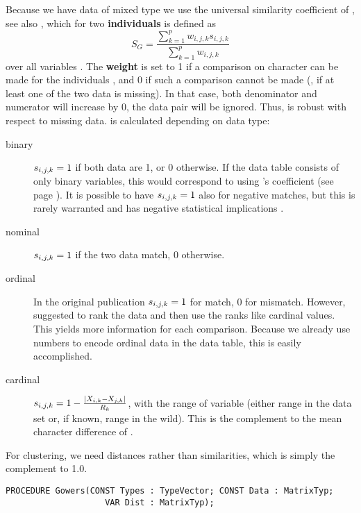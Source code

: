 \begin{refsection}
Because we have data of mixed type we use the universal similarity coefficient of  \parencite{Gow-71}, see also \parencite[chapter 4.4]{Sne-73}, which for two \textbf{individuals}  is defined as
\begin{equation}
  S_G = \frac{\sum_{k=1}^{p}{w_{i,j,k} s_{i,j,k}}}{\sum_{k=1}^{p}{w_{i,j,k}}}
\end{equation}
over all variables . The \textbf{weight}  is set to \num{1} if a comparison on character  can be made for the individuals , and \num{0} if such a comparison cannot be made (, if at least one of the two data is missing). In that case, both denominator and numerator will increase by \num{0}, the data pair will be ignored. Thus,  is robust with respect to missing data.  is calculated depending on data type:
\begin{description}
  \item[binary]{\( s_{i,j,k} = 1 \) if both data are \num{1}, or \num{0} otherwise. If the data table consists of only binary variables, this would correspond to using 's coefficient (see page \pageref{tab:binary}). It is possible to have \(s_{i,j,k} = 1 \) also for negative matches, but this is rarely warranted and has negative statistical implications \parencite{Hub-82}.}
  \item[nominal]{\( s_{i,j,k} = 1 \) if the two data match, \num{0} otherwise. }
  \item[ordinal]{In the original publication \(s_{i,j,k} = 1 \) for match, \num{0} for mismatch. However, \parencite{Pod-99} suggested to rank the data and then use the ranks like cardinal values. This yields more information for each comparison. Because we already use numbers to encode ordinal data in the data table, this is easily accomplished. }
  \item[cardinal]{\( s_{i,j,k} = 1 - \frac{|X_{i,k} - X_{j,k}|}{R_k} \), with  the range of variable  (either range in the data set or, if known, range in the wild). This is the complement to the mean character difference of \parencite{Cai-58}.}
\end{description}
For clustering, we need distances rather than similarities, which is simply the complement to \num{1.0}.

\begin{lstlisting}[caption=Distance matrix]
  PROCEDURE Gowers(CONST Types : TypeVector; CONST Data : MatrixTyp;
                    VAR Dist : MatrixTyp);


\end{lstlisting}
\end{refsection}
